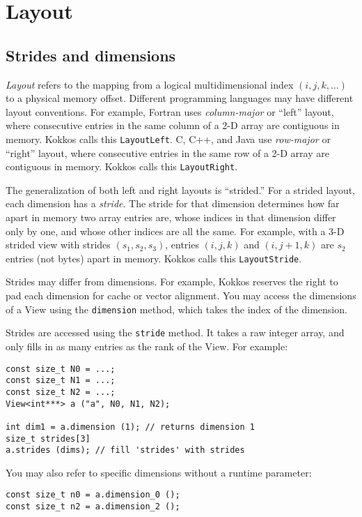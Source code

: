 \section{Layout}\label{S:View:Layout}

\subsection{Strides and dimensions}\label{SS:View:Layout:Strides}

\emph{Layout} refers to the mapping from a logical multidimensional
index $(i, j, k, \dots)$ to a physical memory offset.  Different
programming languages may have different layout conventions.  For
example, Fortran uses \emph{column-major} or ``left'' layout, where
consecutive entries in the same column of a 2-D array are contiguous
in memory.  Kokkos calls this \lstinline!LayoutLeft!.  C, C++, and Java use
\emph{row-major} or ``right'' layout, where consecutive entries in the
same row of a 2-D array are contiguous in memory.  Kokkos calls this
\lstinline!LayoutRight!.

The generalization of both left and right layouts is ``strided.''  For
a strided layout, each dimension has a \emph{stride}.  The stride for
that dimension determines how far apart in memory two array entries
are, whose indices in that dimension differ only by one, and whose
other indices are all the same.  For example, with a 3-D strided view
with strides $(s_1, s_2, s_3)$, entries $(i, j, k)$ and $(i, j+1, k)$
are $s_2$ entries (not bytes) apart in memory.  Kokkos calls this
\lstinline!LayoutStride!.

Strides may differ from dimensions.  For example, Kokkos reserves the
right to pad each dimension for cache or vector alignment.  You may
access the dimensions of a View using the \lstinline!dimension! method,
which takes the index of the dimension.

Strides are accessed using the \lstinline!stride! method.  It takes a raw
integer array, and only fills in as many entries as the rank of the View.
For example:
\begin{lstlisting}
const size_t N0 = ...;
const size_t N1 = ...;
const size_t N2 = ...;
View<int***> a ("a", N0, N1, N2);

int dim1 = a.dimension (1); // returns dimension 1
size_t strides[3]
a.strides (dims); // fill 'strides' with strides
\end{lstlisting}
You may also refer to specific dimensions without a runtime parameter:
\begin{lstlisting}
const size_t n0 = a.dimension_0 ();
const size_t n2 = a.dimension_2 ();
\end{lstlisting}

